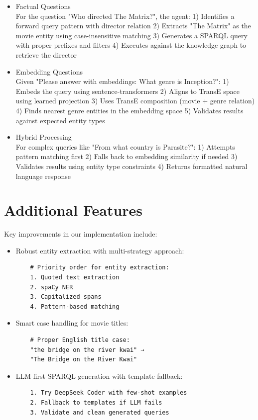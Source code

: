 \documentclass{article}
\begin{document}
\begin{itemize}
    \item Factual Questions\\
    For the question "Who directed The Matrix?", the agent:
    1) Identifies a forward query pattern with director relation
    2) Extracts "The Matrix" as the movie entity using case-insensitive matching
    3) Generates a SPARQL query with proper prefixes and filters
    4) Executes against the knowledge graph to retrieve the director

    \item Embedding Questions\\
    Given "Please answer with embeddings: What genre is Inception?":
    1) Embeds the query using sentence-transformers
    2) Aligns to TransE space using learned projection
    3) Uses TransE composition (movie + genre relation)
    4) Finds nearest genre entities in the embedding space
    5) Validates results against expected entity types

    \item Hybrid Processing\\
    For complex queries like "From what country is Parasite?":
    1) Attempts pattern matching first
    2) Falls back to embedding similarity if needed
    3) Validates results using entity type constraints
    4) Returns formatted natural language response
\end{itemize}

\section{Additional Features}

Key improvements in our implementation include:

\begin{itemize}
    \item Robust entity extraction with multi-strategy approach:
    \begin{verbatim}
    # Priority order for entity extraction:
    1. Quoted text extraction
    2. spaCy NER
    3. Capitalized spans
    4. Pattern-based matching
    \end{verbatim}

    \item Smart case handling for movie titles:
    \begin{verbatim}
    # Proper English title case:
    "the bridge on the river kwai" →
    "The Bridge on the River Kwai"
    \end{verbatim}

    \item LLM-first SPARQL generation with template fallback:
    \begin{verbatim}
    1. Try DeepSeek Coder with few-shot examples
    2. Fallback to templates if LLM fails
    3. Validate and clean generated queries
    \end{verbatim}
\end{itemize}
\end{document}
